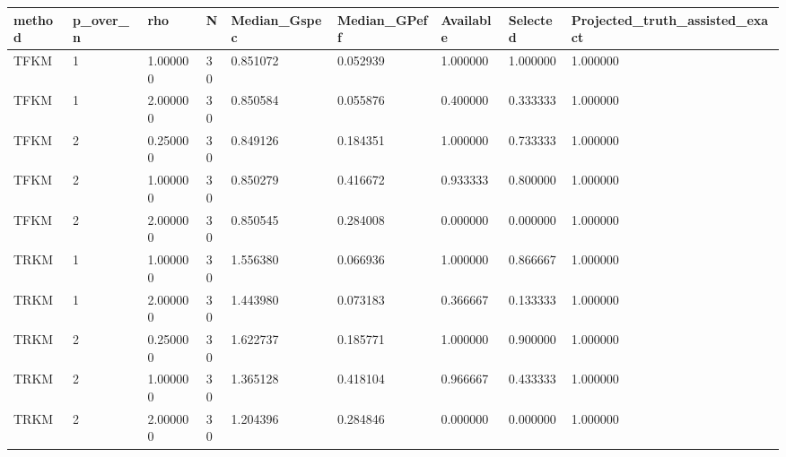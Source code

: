 \begin{tabular}{lllllllll}
\toprule
method & p\_over\_n & rho & N & Median\_Gspec & Median\_GPeff & Available & Selected & Projected\_truth\_assisted\_exact \\
\midrule
TFKM & 1 & 1.000000 & 30 & 0.851072 & 0.052939 & 1.000000 & 1.000000 & 1.000000 \\
TFKM & 1 & 2.000000 & 30 & 0.850584 & 0.055876 & 0.400000 & 0.333333 & 1.000000 \\
TFKM & 2 & 0.250000 & 30 & 0.849126 & 0.184351 & 1.000000 & 0.733333 & 1.000000 \\
TFKM & 2 & 1.000000 & 30 & 0.850279 & 0.416672 & 0.933333 & 0.800000 & 1.000000 \\
TFKM & 2 & 2.000000 & 30 & 0.850545 & 0.284008 & 0.000000 & 0.000000 & 1.000000 \\
TRKM & 1 & 1.000000 & 30 & 1.556380 & 0.066936 & 1.000000 & 0.866667 & 1.000000 \\
TRKM & 1 & 2.000000 & 30 & 1.443980 & 0.073183 & 0.366667 & 0.133333 & 1.000000 \\
TRKM & 2 & 0.250000 & 30 & 1.622737 & 0.185771 & 1.000000 & 0.900000 & 1.000000 \\
TRKM & 2 & 1.000000 & 30 & 1.365128 & 0.418104 & 0.966667 & 0.433333 & 1.000000 \\
TRKM & 2 & 2.000000 & 30 & 1.204396 & 0.284846 & 0.000000 & 0.000000 & 1.000000 \\
\bottomrule
\end{tabular}

